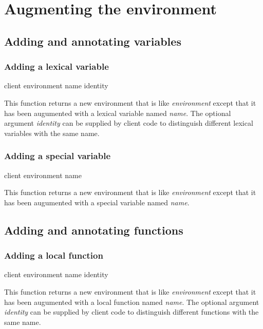 \chapter{Augmenting the environment}

\section{Adding and annotating variables}

\subsection{Adding a lexical variable}

 {client environment name \optional identity}

This function returns a new environment that is like
\textit{environment} except that it has been augumented with a lexical
variable named \textit{name}.  The optional argument \textit{identity}
can be supplied by client code to distinguish different lexical
variables with the same name.

\subsection{Adding a special variable}

 {client environment name}

This function returns a new environment that is like
\textit{environment} except that it has been augumented with a special
variable named \textit{name}.

\section{Adding and annotating functions}

\subsection{Adding a local function}

 {client environment name \optional identity}

This function returns a new environment that is like
\textit{environment} except that it has been augumented with a local
function named \textit{name}.  The optional argument \textit{identity}
can be supplied by client code to distinguish different functions with
the same name.


